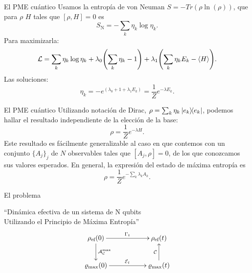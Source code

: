 \begin{frame}{El PME cuántico}
    Usamos la entropía de von Neuman $S=-Tr(\rho\ln(\rho))$, que para $\rho$ $H$ tales que $[\rho,H]=0$ es
    \begin{equation}
        S_{\text{N}}=-\sum_{k}\eta_{k}\log{\eta_{k}}.\nonumber
    \end{equation}
    Para maximizarla:
    \begin{equation}
        \mathcal{L}=\sum_{k}\eta_{k}\log{\eta_{k}}+\lambda_{0}\qty(\sum_{k}\eta_{k}-1)+\lambda_{1}\qty(\sum_{k}\eta_{k}E_{k}-\expval{H}).\nonumber
    \end{equation}
    Las soluciones:
    \begin{equation}
        \eta_{k}=-e^{(\lambda_{0}+1+\lambda_{1}E_{k})}=\frac{1}{Z}e^{-\lambda E_{k}}.\nonumber
    \end{equation}
\end{frame}

\begin{frame}{El PME cuántico}
    Utilizando notación de Dirac, $\rho=\sum_{k}\eta_{k}\dyad{e_{k}}$, podemos hallar el resultado independiente de la elección de la base:
    \begin{equation}
        \rho=\frac{1}{Z}e^{-\lambda H}.\nonumber
    \end{equation}
    Este resultado es fácilmente generalizable al caso en que contemos con un  conjunto $\{A_{j}\}_{j}$ de $N$ observables tales que $[A_{j},\rho]=0$, de los que conozcamos sus valores esperados. En general, la expresión del estado de máxima entropía es
    \begin{equation}\label{eq:GeneralMaxEnt}
        \rho=\frac{1}{Z}e^{-\sum_{k}\lambda_{k} A_{k}}.\nonumber
    \end{equation}
\end{frame}


\begin{frame}{El problema}
    \begin{center}
        ``Dinámica efectiva de un sistema de N qubits\\
        Utilizando el Principio de Máxima Entropía''
        \begin{displaymath}
            \xymatrix{
              {\rho_{\ef}(0)} \ar[rr]^{\Gamma_{t}} \ar[d]^{\mcA_{\mcC}^{\max}}
              && {\rho_{\ef}(t)}\\
              {\varrho_{\max}(0)} \ar[rr]^{\mcE_{t}}
              && {\varrho_{\max}(t)} \ar[u]^{\mcC}
            }
          \end{displaymath}
    \end{center}
\end{frame}